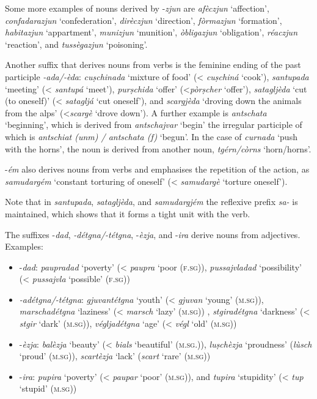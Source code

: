 Some more examples of nouns derived by -\textit{zjun} are \textit{afèczjun} `affection', \textit{confadarazjun} `confederation', \textit{dirèczjun} `direction', \textit{fòrmazjun} `formation', \textit{habitazjun} `appartment', \textit{munizjun} `munition', \textit{òbligazjun} `obligation', \textit{réaczjun} `reaction', and \textit{tussègazjun} `poisoning'.

Another suffix that derives nouns from verbs is the feminine ending of the past participle \textit{-ada/-èda}: \textit{cuṣchinada} `mixture of food' (< \textit{cuṣchiná} `cook'), \textit{santupada} `meeting' (< \textit{santupá} `meet'), \textit{purṣchida} `offer' (<\textit{pòrṣcher} `offer'), \textit{satagljèda} `cut (to oneself)' (< \textit{satagljá} `cut oneself'), and \textit{scargjèda} `droving down the animals from the alps' (<\textit{scargè} `drove down'). A further example is \textit{antschata} `beginning', which is derived from \textit{antschajvar} `begin' the irregular participle of which is \textit{antschiat (unm) / antschata (f)} `begun'. In the case of \textit{curnada} `push with the horns', the noun is derived from another noun, \textit{tgérn/còrns} `horn/horns'.

-\textit{ém} also derives nouns from verbs and emphasises the repetition of the action, as \textit{samudargém} `constant torturing of oneself' (< \textit{samudargè} `torture oneself').

Note that in \textit{santupada}, \textit{satagljèda}, and \textit{samudargjém} the reflexive prefix \textit{sa-} is maintained, which shows that it forms a tight unit with the verb.

The suffixes -\textit{dad}, \textit{-détgna/-tétgna}, -\textit{èzja}, and -\textit{ira} derive nouns from adjectives. Examples:

\begin{itemize}
	\item -\textit{dad}: \textit{paupradad} `poverty' (< \textit{paupra} `poor (\textsc{f.sg})), \textit{pussajvladad} `possibility' (< \textit{pussajvla} `possible' (\textsc{f.sg}))
	
	\item \textit{-adétgna/-tétgna}: \textit{gjuvantétgna} `youth' (< \textit{gjuvan} `young' \textsc{(m.sg})), \textit{marschadétgna} `laziness' (< \textit{marsch} `lazy' (\textsc{m.sg})) , \textit{stgiradétgna} `darkness' (< \textit{stgir} `dark' (\textsc{m.sg})), \textit{végljadétgna} `age' (< \textit{végl} `old' (\textsc{m.sg}))
	
	\item -\textit{èzja}: \textit{balèzja} `beauty' (< \textit{bials} `beautiful' (\textsc{m.sg.})), \textit{luṣchèzja} `proudness' (\textit{lùsch} `proud' \textsc{(m.sg})), \textit{scartèzja} `lack' (\textit{scart} `rare' (\textsc{m.sg}))
	
	\item -\textit{ira}: \textit{pupira} `poverty' (< \textit{paupar} `poor' \textsc{(m.sg})), and \textit{tupira} `stupidity' (< \textit{tup} `stupid' \textsc{(m.sg}))
\end{itemize}

